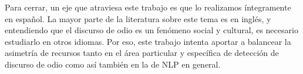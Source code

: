 Para cerrar, un eje que atraviesa este trabajo es que lo realizamos íntegramente en español. La mayor parte de la literatura sobre este tema es en inglés, y entendiendo que el discurso de odio es un fenómeno social y cultural, es necesario estudiarlo en otros idiomas. Por eso, este trabajo intenta aportar a balancear la asimetría de recursos tanto en el área particular y específica de detección de discurso de odio como así también en la de NLP en general.